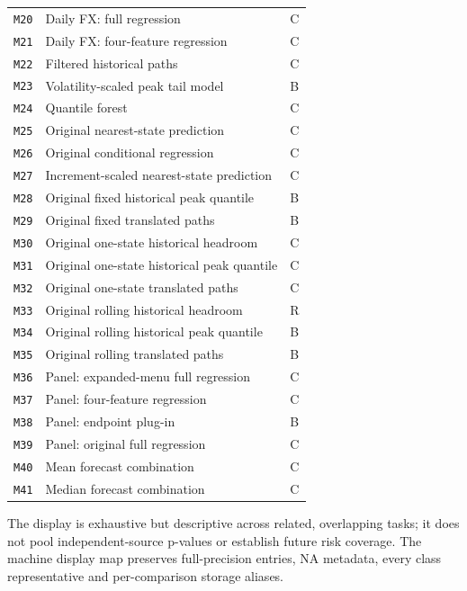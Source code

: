 \documentclass[10pt,a4paper]{article}
\begin{document}
\begin{longtable}{@{}lp{118mm}l@{}}
\texttt{M20} & Daily FX: full regression & C \\
\texttt{M21} & Daily FX: four-feature regression & C \\
\texttt{M22} & Filtered historical paths & C \\
\texttt{M23} & Volatility-scaled peak tail model & B \\
\texttt{M24} & Quantile forest & C \\
\texttt{M25} & Original nearest-state prediction & C \\
\texttt{M26} & Original conditional regression & C \\
\texttt{M27} & Increment-scaled nearest-state prediction & C \\
\texttt{M28} & Original fixed historical peak quantile & B \\
\texttt{M29} & Original fixed translated paths & B \\
\texttt{M30} & Original one-state historical headroom & C \\
\texttt{M31} & Original one-state historical peak quantile & C \\
\texttt{M32} & Original one-state translated paths & C \\
\texttt{M33} & Original rolling historical headroom & R \\
\texttt{M34} & Original rolling historical peak quantile & B \\
\texttt{M35} & Original rolling translated paths & B \\
\texttt{M36} & Panel: expanded-menu full regression & C \\
\texttt{M37} & Panel: four-feature regression & C \\
\texttt{M38} & Panel: endpoint plug-in & B \\
\texttt{M39} & Panel: original full regression & C \\
\texttt{M40} & Mean forecast combination & C \\
\texttt{M41} & Median forecast combination & C \\
\bottomrule
\end{longtable}
\noindent The display is exhaustive but descriptive across related, overlapping tasks; it does not pool independent-source p-values or establish future risk coverage. The machine display map preserves full-precision entries, NA metadata, every class representative and per-comparison storage aliases.
\endgroup
\end{document}
